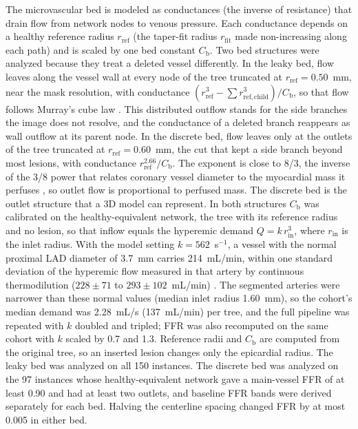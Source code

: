 \documentclass[journal,twoside,web]{ieeecolor}
\begin{document}
The microvascular bed is modeled as conductances (the inverse of resistance) that drain flow from network nodes to
venous pressure. Each conductance depends on a healthy reference radius $r_\mathrm{ref}$ (the taper-fit radius
$r_\mathrm{fit}$ made non-increasing along each path) and is scaled by one bed constant $C_\mathrm{b}$. Two bed structures were analyzed because they treat a deleted vessel differently. In the leaky
bed, flow leaves along the vessel wall at every node of the tree truncated at $r_\mathrm{ref} = 0.50$~mm, near the mask resolution, with
conductance $(r_\mathrm{ref}^3 - \sum r_{\mathrm{ref},\mathrm{child}}^3)/C_\mathrm{b}$, so that flow follows Murray's cube law
\cite{murray1926}. This distributed outflow stands for the side branches the image does not resolve, and the
conductance of a deleted branch reappears as wall outflow at its parent node. In the discrete bed, flow leaves only
at the outlets of the tree truncated at $r_\mathrm{ref} = 0.60$~mm, the cut that kept a side branch beyond most lesions, with conductance $r_\mathrm{ref}^{2.66}/C_\mathrm{b}$.
The exponent is close to 8/3, the inverse of the 3/8 power that relates coronary vessel diameter to the
myocardial mass it perfuses \cite{choy2008}, so outlet flow is proportional to perfused mass. The discrete bed is the outlet structure that a 3D model can
represent. In both structures $C_\mathrm{b}$ was calibrated on the healthy-equivalent network, the tree with its reference
radius and no lesion, so that inflow equals the hyperemic demand $Q = k\,r_\mathrm{in}^3$, where $r_\mathrm{in}$ is
the inlet radius. With the model setting $k = 562$~s$^{-1}$, a
vessel with the normal proximal LAD diameter of 3.7~mm \cite{dodge1992} carries 214~mL/min,
within one standard deviation of the hyperemic flow measured in that artery by continuous thermodilution
($228 \pm 71$ to $293 \pm 102$~mL/min) \cite{fournier2021}. The segmented arteries were narrower than these
normal values (median inlet radius 1.60~mm), so the cohort's median demand was 2.28~mL/s (137~mL/min) per tree, and
the full pipeline was repeated with $k$ doubled and tripled; FFR was also recomputed on the same cohort with $k$ scaled by 0.7 and 1.3. Reference radii and $C_\mathrm{b}$ are computed from the original tree, so an inserted lesion changes
only the epicardial radius. The leaky bed was analyzed on all 150 instances. The discrete bed was analyzed on the
97 instances whose healthy-equivalent network gave a main-vessel FFR of at least 0.90 and had at least two outlets,
and baseline FFR bands were derived separately for each bed. Halving the centerline spacing changed FFR by at most
0.005 in either bed.
\end{document}
